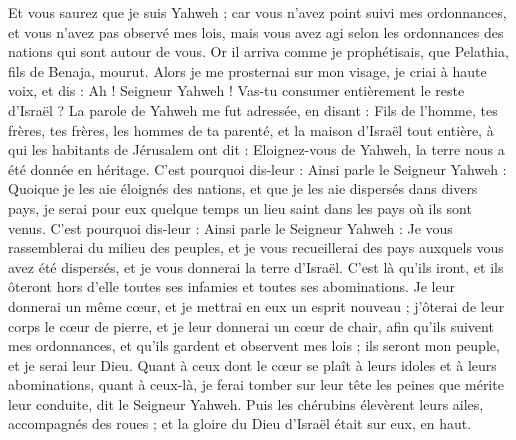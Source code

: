 \begin{multicols}{2}
Et vous saurez que je suis Yahweh ; car vous n'avez point suivi mes ordonnances, et vous n'avez pas observé mes lois, mais vous avez agi selon les ordonnances des nations qui sont autour de vous.
Or il arriva comme je prophétisais, que Pelathia, fils de Benaja, mourut.  Alors je me prosternai sur mon visage, je criai à haute voix, et dis : Ah ! Seigneur Yahweh ! Vas-tu consumer entièrement le reste d'Israël ?
La parole de Yahweh me fut adressée, en disant :
Fils de l’homme, tes frères, tes frères, les hommes de ta parenté, et la maison d'Israël tout entière, à qui les habitants de Jérusalem ont dit : Eloignez-vous de Yahweh, la terre nous a été donnée en héritage.
C'est pourquoi dis-leur : Ainsi parle le Seigneur Yahweh : Quoique je les aie éloignés des nations, et que je les aie dispersés dans divers pays, je serai pour eux quelque temps un lieu saint dans les pays où ils sont venus.
C'est pourquoi dis-leur : Ainsi parle le Seigneur Yahweh : Je vous rassemblerai du milieu des peuples, et je vous recueillerai des pays auxquels vous avez été dispersés, et je vous donnerai la terre d'Israël.
C’est là qu’ils iront, et ils ôteront hors d'elle toutes ses infamies et toutes ses abominations.
Je leur donnerai  un même cœur, et je mettrai en eux un esprit nouveau ; j'ôterai de leur corps le cœur de pierre, et je leur donnerai un cœur de chair,
afin qu'ils suivent mes ordonnances, et qu'ils gardent et observent mes lois ; ils seront mon peuple, et je serai leur Dieu.
Quant à ceux dont le cœur se plaît à leurs idoles et à leurs abominations, quant à ceux-là, je ferai tomber sur leur tête les peines que mérite leur conduite, dit le Seigneur Yahweh.
Puis les chérubins élevèrent leurs ailes, accompagnés des roues ; et la gloire du Dieu d'Israël était sur eux, en haut.

\end{multicols}
